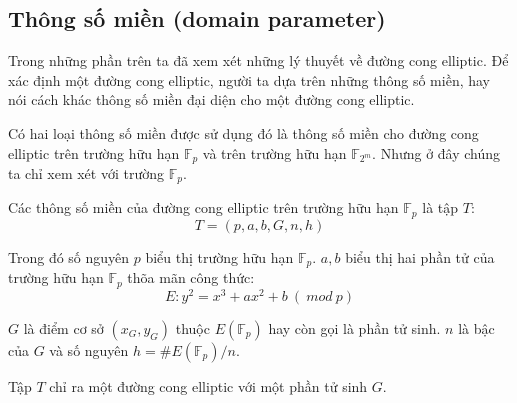 \documentclass[a4paper,12pt]{report}
\begin{document}
\subsection*{Thông số miền (domain parameter)}
Trong những phần trên ta đã xem xét những lý thuyết về đường cong elliptic. Để xác định một đường cong elliptic, người ta dựa trên những thông số miền, hay nói cách khác thông số miền đại diện cho một đường cong elliptic.

Có hai loại thông số miền được sử dụng đó là thông số miền cho đường cong elliptic trên trường hữu hạn $\mathbb{F}_p$ và trên trường hữu hạn $\mathbb{F}_{2^m}$. Nhưng ở đây chúng ta chỉ xem xét với trường $\mathbb{F}_p$.

Các thông số miền của đường cong elliptic trên trường hữu hạn $\mathbb{F}_p$ là tập $T$:
\begin{displaymath}
T = (p, a, b, G, n, h)
\end{displaymath}

Trong đó số nguyên $p$ biểu thị trường hữu hạn $\mathbb{F}_p$. $a , b$ biểu thị hai phần tử của trường hữu hạn $\mathbb{F}_p$ thõa mãn công thức:
\begin{displaymath}
E: y^2 = x^3 + ax^2 + b \ (\ mod \ p)
\end{displaymath}

$G$ là điểm cơ sở $(x_G, y_G)$ thuộc $E(\mathbb{F}_p)$ hay còn gọi là phần tử sinh. $n$ là bậc của $G$ và số nguyên $h = \#E(\mathbb{F}_p)/n$.

Tập $T$ chỉ ra một đường cong elliptic với một phần tử sinh $G$.
\end{document}
